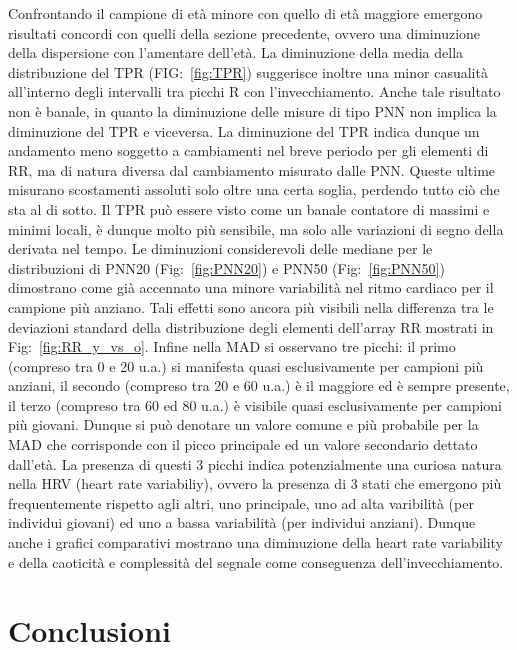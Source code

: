 \documentclass[a4paper, 12pt]{book}
\begin{document}
Confrontando il campione di età minore con quello di età maggiore emergono risultati concordi con quelli della sezione precedente, ovvero una diminuzione della dispersione con l'amentare dell'età.
La diminuzione della media della distribuzione del TPR (FIG:~\ref{fig:TPR}) suggerisce inoltre una minor casualità all'interno degli intervalli tra picchi R con l'invecchiamento.
Anche tale risultato non è banale, in quanto la diminuzione delle misure di tipo PNN non implica la diminuzione del TPR e viceversa.
La diminuzione del TPR indica dunque un andamento meno soggetto a cambiamenti nel breve periodo per gli elementi di RR, ma di natura diversa dal cambiamento misurato dalle PNN.
Queste ultime misurano scostamenti assoluti solo oltre una certa soglia, perdendo tutto ciò che sta al di sotto.
Il TPR può essere visto come un banale contatore di massimi e minimi locali, è dunque molto più sensibile, ma solo alle variazioni di segno della derivata nel tempo.
Le diminuzioni considerevoli delle mediane per le distribuzioni di PNN20 (Fig:~\ref{fig:PNN20}) e PNN50 (Fig:~\ref{fig:PNN50}) dimostrano come già accennato una minore variabilità nel ritmo cardiaco per il campione più anziano.
Tali effetti sono ancora più visibili nella differenza tra le deviazioni standard della distribuzione degli elementi dell'array RR mostrati in Fig:~\ref{fig:RR_y_vs_o}.
Infine nella MAD si osservano tre picchi: il primo (compreso tra 0 e 20 u.a.) si manifesta quasi esclusivamente per campioni più anziani, il secondo (compreso tra 20 e 60 u.a.) è il maggiore ed è sempre presente, il terzo (compreso tra 60 ed 80 u.a.) è visibile quasi esclusivamente per campioni più giovani.
Dunque si può denotare un valore comune e più probabile per la MAD che corrisponde con il picco principale ed un valore secondario dettato dall'età.
La presenza di questi 3 picchi indica potenzialmente una curiosa natura nella HRV (heart rate variabiliy), ovvero la presenza di 3 stati che emergono più frequentemente rispetto agli altri, uno principale, uno ad alta varibilità (per individui giovani) ed uno a bassa variabilità (per individui anziani).
Dunque anche i grafici comparativi mostrano una diminuzione della heart rate variability e della caoticità e complessità del segnale come conseguenza dell'invecchiamento.



\chapter{Conclusioni}
\end{document}
